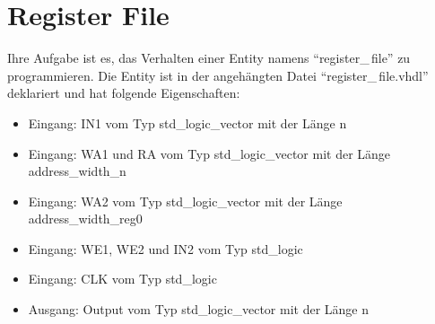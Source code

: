 \documentclass[a4paper,12pt]{article}
\begin{document}
\pagestyle{empty}
\setlength{\parindent}{0em}
\section*{Register File}

Ihre Aufgabe ist es, das Verhalten einer Entity  namens "`register\_\,file"' zu programmieren. Die Entity ist in der angeh\"angten Datei "`register\_\,file.vhdl"' deklariert und hat folgende Eigenschaften:

\begin{itemize}
\item Eingang:  IN1 vom Typ std\_logic\_vector mit der L\"ange {{n}}
\item Eingang:  WA1 und RA vom Typ std\_logic\_vector mit der L\"ange {{address_width_n}}

\item Eingang:  WA2 vom Typ std\_logic\_vector mit der L\"ange {{address_width_reg0}}


\item Eingang:  WE1, WE2 und IN2 vom Typ std\_logic

\item Eingang:  CLK vom Typ std\_logic


\item Ausgang: Output vom Typ std\_logic\_vector mit der L\"ange {{n}}
\end{itemize}
\end{document}

